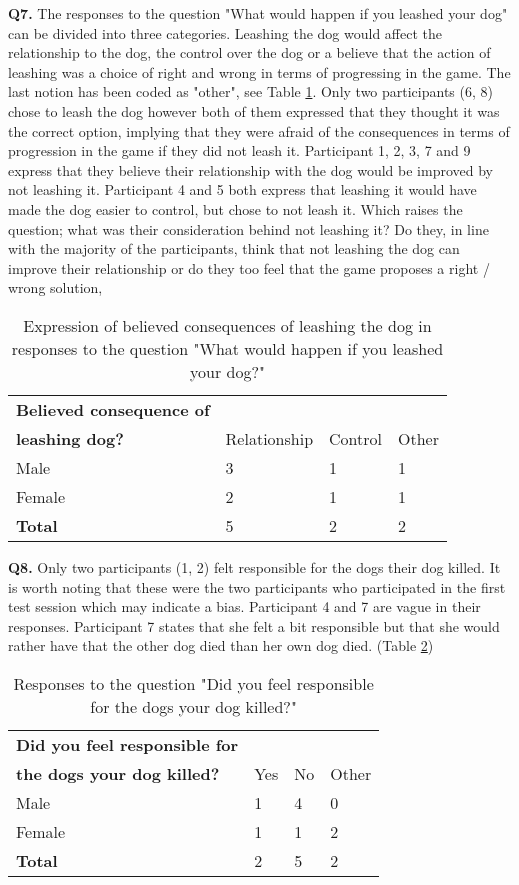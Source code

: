 \textbf{Q7.} The responses to the question "What would happen if you leashed your dog" can be divided into three categories. Leashing the dog would affect the relationship to the dog, the control over the dog or a believe that the action of leashing was a choice of right and wrong in terms of progressing in the game. The last notion has been coded as "other", see Table \ref{tab:leash}. Only two participants (6, 8) chose to leash the dog however both of them expressed that they thought it was the correct option, implying that they were afraid of the consequences in terms of progression in the game if they did not leash it. Participant 1, 2, 3, 7 and 9 express that they believe their relationship with the dog would be improved by not leashing it. Participant 4 and 5 both express that leashing it would have made the dog easier to control, but chose to not leash it. Which raises the question; what was their consideration behind not leashing it? Do they, in line with the majority of the participants, think that not leashing the dog can improve their relationship or do they too feel that the game proposes a right / wrong solution,

\begin{table}[h]
\centering
\begin{tabular}{l l l l}
\hline
\textbf{Believed consequence of}\\
\textbf{leashing dog?} & Relationship & Control & Other \\
\hline
Male & 3 & 1 & 1 \\
Female & 2 & 1 & 1 \\
\textbf{Total} & 5 & 2 & 2 \\
\hline
\end{tabular}
\caption{\label{tab:leash}Expression of believed consequences of leashing the dog in responses to the question "What would happen if you leashed your dog?"}
\end{table}


\textbf{Q8.} Only two participants (1, 2) felt responsible for the dogs their dog killed. It is worth noting that these were the two participants who participated in the first test session which may indicate a bias. Participant 4 and 7 are vague in their responses. Participant 7 states that she felt a bit responsible but that she would rather have that the other dog died than her own dog died. (Table \ref{tab:resp})

\begin{table}[h]
\centering
\begin{tabular}{l l l l}
\hline
\textbf{Did you feel responsible for}\\
\textbf{the dogs your dog killed?} & Yes & No & Other \\
\hline
Male & 1 & 4 & 0 \\
Female & 1 & 1 & 2 \\
\textbf{Total} & 2 & 5 & 2 \\
\hline
\end{tabular}
\caption{\label{tab:resp}Responses to the question "Did you feel responsible for the dogs your dog killed?"}
\end{table}


